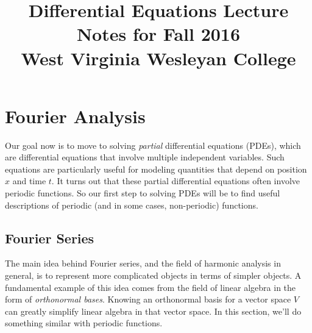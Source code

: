\documentclass[10pt,]{book}
\title{Differential Equations Lecture Notes for Fall 2016\\
{\large West Virginia Wesleyan College}}
\author{}
\date{}
\theoremstyle{plain}
\theoremstyle{definition}
\theoremstyle{definition}
\numberwithin{equation}{section}
\begin{document}
\typeout{************************************************}
\typeout{************************************************}
\chapter[{Fourier Analysis}]{Fourier Analysis}\label{fourier-analysis}
\typeout{************************************************}
\typeout{************************************************}
Our goal now is to move to solving \emph{partial} differential equations (PDEs), which are differential equations that involve multiple independent variables. Such equations are particularly useful for modeling quantities that depend on position \(x\) and time \(t\). It turns out that these partial differential equations often involve periodic functions. So our first step to solving PDEs will be to find useful descriptions of periodic (and in some cases, non-periodic) functions.%
\typeout{************************************************}
\typeout{************************************************}
\section[{Fourier Series}]{Fourier Series}\label{section-fourier-series}
The main idea behind Fourier series, and the field of harmonic analysis in general, is to represent more complicated objects in terms of simpler objects. A fundamental example of this idea comes from the field of linear algebra in the form of \emph{orthonormal bases}. Knowing an orthonormal basis for a vector space \(V\) can greatly simplify linear algebra in that vector space. In this section, we'll do something similar with periodic functions.%
\typeout{************************************************}
\typeout{************************************************}
\end{document}
